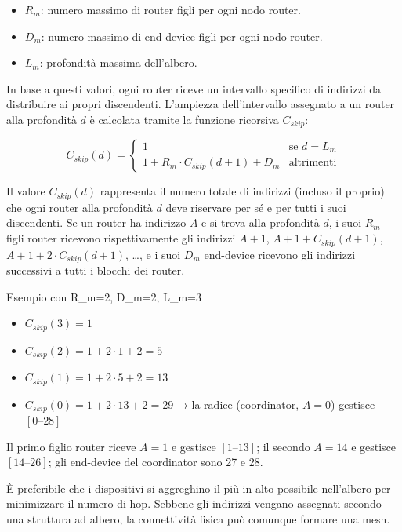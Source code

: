\documentclass[
  italian,
  openany]{book}
\providecommand{\tightlist}{%
  \setlength{\itemsep}{0pt}\setlength{\parskip}{0pt}}
\begin{document}
\begin{itemize}
\tightlist
\item
  \(R_m\): numero massimo di router figli per ogni nodo router.
\item
  \(D_m\): numero massimo di end-device figli per ogni nodo router.
\item
  \(L_m\): profondità massima dell'albero.
\end{itemize}

In base a questi valori, ogni router riceve un intervallo specifico di
indirizzi da distribuire ai propri discendenti. L'ampiezza
dell'intervallo assegnato a un router alla profondità \(d\) è calcolata
tramite la funzione ricorsiva \(C_{skip}\):

\[
C_{skip}(d) = \begin{cases} 1 & \text{se } d = L_m \\ 1 + R_m \cdot C_{skip}(d+1) + D_m & \text{altrimenti} \end{cases}
\]

Il valore \(C_{skip}(d)\) rappresenta il numero totale di indirizzi
(incluso il proprio) che ogni router alla profondità \(d\) deve
riservare per sé e per tutti i suoi discendenti. Se un router ha
indirizzo \(A\) e si trova alla profondità \(d\), i suoi \(R_m\) figli
router ricevono rispettivamente gli indirizzi \(A+1\),
\(A+1+C_{skip}(d+1)\), \(A+1+2\cdot C_{skip}(d+1)\), \ldots, e i suoi
\(D_m\) end-device ricevono gli indirizzi successivi a tutti i blocchi
dei router.

\begin{callouttip}{Esempio con R\_m=2, D\_m=2, L\_m=3}

\begin{itemize}
\tightlist
\item
  \(C_{skip}(3) = 1\)
\item
  \(C_{skip}(2) = 1 + 2 \cdot 1 + 2 = 5\)
\item
  \(C_{skip}(1) = 1 + 2 \cdot 5 + 2 = 13\)
\item
  \(C_{skip}(0) = 1 + 2 \cdot 13 + 2 = 29\) → la radice (coordinator,
  \(A=0\)) gestisce \([0\text{–}28]\)
\end{itemize}

Il primo figlio router riceve \(A=1\) e gestisce \([1\text{–}13]\); il
secondo \(A=14\) e gestisce \([14\text{–}26]\); gli end-device del
coordinator sono 27 e 28.

\end{callouttip}

È preferibile che i dispositivi si aggreghino il più in alto possibile
nell'albero per minimizzare il numero di hop. Sebbene gli indirizzi
vengano assegnati secondo una struttura ad albero, la connettività
fisica può comunque formare una mesh.
\end{document}
